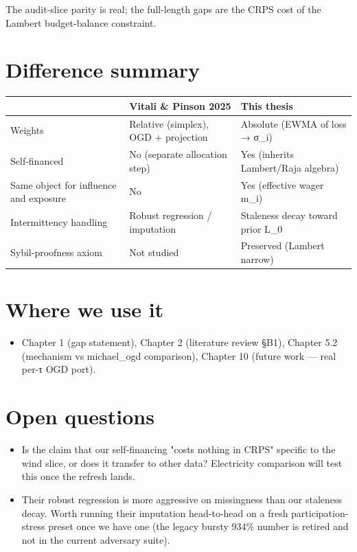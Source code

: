 \documentclass[11pt,a4paper,openany]{report}
\begin{document}
The audit-slice parity is real; the full-length gaps are the CRPS
cost of the Lambert budget-balance constraint.

\section{Difference summary}

\begin{center}
\small
\begin{tabular}{lll}
\toprule
\textbf{} & \textbf{Vitali \& Pinson 2025} & \textbf{This thesis} \\
\midrule
Weights & Relative (simplex), OGD + projection & Absolute (EWMA of loss → σ\_i) \\
Self-financed & No (separate allocation step) & Yes (inherits Lambert/Raja algebra) \\
Same object for influence and exposure & No & Yes (effective wager m\_i) \\
Intermittency handling & Robust regression / imputation & Staleness decay toward prior L\_0 \\
Sybil-proofness axiom & Not studied & Preserved (Lambert narrow) \\
\bottomrule
\end{tabular}
\end{center}

\section{Where we use it}

\begin{itemize}
  \item Chapter 1 (gap statement), Chapter 2 (literature review §B1),
    Chapter 5.2 (mechanism vs michael\_ogd comparison), Chapter 10
    (future work — real per-τ OGD port).
\end{itemize}

\section{Open questions}

\begin{itemize}
  \item Is the claim that our self-financing "costs nothing in CRPS" specific
    to the wind slice, or does it transfer to other data? Electricity
    comparison will test this once the refresh lands.
  \item Their robust regression is more aggressive on missingness than our
    staleness decay. Worth running their imputation head-to-head on a
    fresh participation-stress preset once we have one (the legacy
    bursty 934\% number is retired and not in the current adversary
    suite).
\end{itemize}
\end{document}
